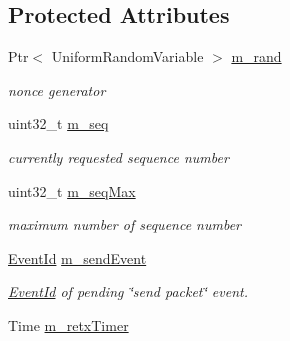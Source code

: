 \subsection*{Protected Attributes}
\begin{DoxyCompactItemize}
\item 
Ptr$<$ Uniform\+Random\+Variable $>$ \hyperlink{classns3_1_1ndn_1_1Consumer_aab4d16bd9a89ab5a0543c50ebb3d74c8}{m\+\_\+rand}\hypertarget{classns3_1_1ndn_1_1Consumer_aab4d16bd9a89ab5a0543c50ebb3d74c8}{}\label{classns3_1_1ndn_1_1Consumer_aab4d16bd9a89ab5a0543c50ebb3d74c8}

\begin{DoxyCompactList}\small\item\em nonce generator \end{DoxyCompactList}\item 
uint32\+\_\+t \hyperlink{classns3_1_1ndn_1_1Consumer_af98abc4aa7b47b1d87863dd81f15e991}{m\+\_\+seq}\hypertarget{classns3_1_1ndn_1_1Consumer_af98abc4aa7b47b1d87863dd81f15e991}{}\label{classns3_1_1ndn_1_1Consumer_af98abc4aa7b47b1d87863dd81f15e991}

\begin{DoxyCompactList}\small\item\em currently requested sequence number \end{DoxyCompactList}\item 
uint32\+\_\+t \hyperlink{classns3_1_1ndn_1_1Consumer_ab21d74e8ef2fd4e40eeebaee4f446731}{m\+\_\+seq\+Max}\hypertarget{classns3_1_1ndn_1_1Consumer_ab21d74e8ef2fd4e40eeebaee4f446731}{}\label{classns3_1_1ndn_1_1Consumer_ab21d74e8ef2fd4e40eeebaee4f446731}

\begin{DoxyCompactList}\small\item\em maximum number of sequence number \end{DoxyCompactList}\item 
\hyperlink{classEventId}{Event\+Id} \hyperlink{classns3_1_1ndn_1_1Consumer_aabbe248f1788c85c0a7be9c682605dee}{m\+\_\+send\+Event}\hypertarget{classns3_1_1ndn_1_1Consumer_aabbe248f1788c85c0a7be9c682605dee}{}\label{classns3_1_1ndn_1_1Consumer_aabbe248f1788c85c0a7be9c682605dee}

\begin{DoxyCompactList}\small\item\em \hyperlink{classEventId}{Event\+Id} of pending \char`\"{}send packet\char`\"{} event. \end{DoxyCompactList}\item 
Time \hyperlink{classns3_1_1ndn_1_1Consumer_a3cf54d87887280fe9ccf973a45634b62}{m\+\_\+retx\+Timer}\hypertarget{classns3_1_1ndn_1_1Consumer_a3cf54d87887280fe9ccf973a45634b62}{}\label{classns3_1_1ndn_1_1Consumer_a3cf54d87887280fe9ccf973a45634b62}


\end{DoxyCompactItemize}
